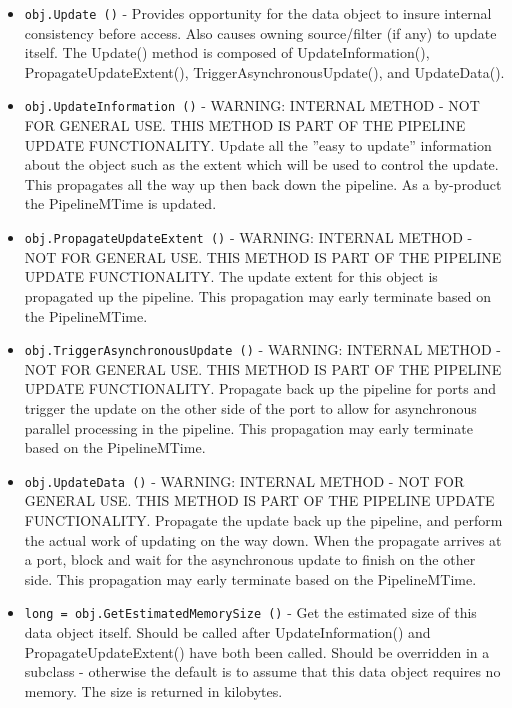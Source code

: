 \begin{itemize}
\item  \verb|obj.Update ()| -  Provides opportunity for the data object to insure internal 
 consistency before access. Also causes owning source/filter 
 (if any) to update itself. The Update() method is composed of 
 UpdateInformation(), PropagateUpdateExtent(), 
 TriggerAsynchronousUpdate(), and UpdateData().

\item  \verb|obj.UpdateInformation ()| -  WARNING: INTERNAL METHOD - NOT FOR GENERAL USE. 
 THIS METHOD IS PART OF THE PIPELINE UPDATE FUNCTIONALITY.
 Update all the ''easy to update'' information about the object such
 as the extent which will be used to control the update.
 This propagates all the way up then back down the pipeline.
 As a by-product the PipelineMTime is updated.

\item  \verb|obj.PropagateUpdateExtent ()| -  WARNING: INTERNAL METHOD - NOT FOR GENERAL USE. 
 THIS METHOD IS PART OF THE PIPELINE UPDATE FUNCTIONALITY.
 The update extent for this object is propagated up the pipeline.
 This propagation may early terminate based on the PipelineMTime.

\item  \verb|obj.TriggerAsynchronousUpdate ()| -  WARNING: INTERNAL METHOD - NOT FOR GENERAL USE. 
 THIS METHOD IS PART OF THE PIPELINE UPDATE FUNCTIONALITY.
 Propagate back up the pipeline for ports and trigger the update on the
 other side of the port to allow for asynchronous parallel processing in
 the pipeline.
 This propagation may early terminate based on the PipelineMTime.

\item  \verb|obj.UpdateData ()| -  WARNING: INTERNAL METHOD - NOT FOR GENERAL USE. 
 THIS METHOD IS PART OF THE PIPELINE UPDATE FUNCTIONALITY.
 Propagate the update back up the pipeline, and perform the actual 
 work of updating on the way down. When the propagate arrives at a
 port, block and wait for the asynchronous update to finish on the
 other side.
 This propagation may early terminate based on the PipelineMTime.

\item  \verb|long = obj.GetEstimatedMemorySize ()| -  Get the estimated size of this data object itself. Should be called
 after UpdateInformation() and PropagateUpdateExtent() have both been 
 called. Should be overridden in a subclass - otherwise the default
 is to assume that this data object requires no memory.
 The size is returned in kilobytes.


\end{itemize}
